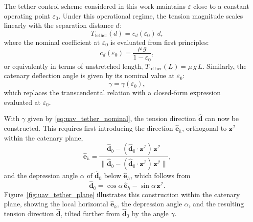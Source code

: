 The tether control scheme considered in this work maintains $\varepsilon$ close to a constant operating point $\varepsilon_0$. Under this operational regime, the tension magnitude scales linearly with the separation distance $d$:
\begin{equation}
    T_{\mathrm{tether}}(d) = c_d(\varepsilon_0)\,d,
    \label{eq:uav_tether_magnitude}
\end{equation}
where the nominal coefficient at $\varepsilon_0$ is evaluated from first principles:
\begin{equation}
    c_d(\varepsilon_0) = \frac{\mu\,g}{1 - \varepsilon_0},
    \label{eq:uav_tether_cd_nominal}
\end{equation}
or equivalently in terms of unstretched length, $T_{\mathrm{tether}}(L) = \mu\,g\,L$. Similarly, the catenary deflection angle is given by its nominal value at $\varepsilon_0$:
\begin{equation}
    \gamma = \gamma(\varepsilon_0),
    \label{eq:uav_tether_nominal}
\end{equation}
which replaces the transcendental relation with a closed-form expression evaluated at $\varepsilon_0$.

With $\gamma$ given by \eqref{eq:uav_tether_nominal}, the tension direction $\hat{\mathbf{d}}$ can now be constructed. This requires first introducing the direction $\hat{\mathbf{e}}_h$, orthogonal to $\mathbf{z}^{\mathcal{I}}$ within the catenary plane,
\begin{equation}
    \hat{\mathbf{e}}_h = \frac{\hat{\mathbf{d}}_0 - (\hat{\mathbf{d}}_0\cdot\mathbf{z}^{\mathcal{I}})\,\mathbf{z}^{\mathcal{I}}}{\|\hat{\mathbf{d}}_0 - (\hat{\mathbf{d}}_0\cdot\mathbf{z}^{\mathcal{I}})\,\mathbf{z}^{\mathcal{I}}\|},
    \label{eq:uav_tether_horizontal}
\end{equation}
and the depression angle $\alpha$ of $\hat{\mathbf{d}}_0$ below $\hat{\mathbf{e}}_h$, which follows from
\begin{equation}
    \hat{\mathbf{d}}_0 = \cos\alpha\,\hat{\mathbf{e}}_h - \sin\alpha\,\mathbf{z}^{\mathcal{I}}.
    \label{eq:uav_tether_alpha}
\end{equation}
Figure~\ref{fig:uav_tether_plane} illustrates this construction within the catenary plane, showing the local horizontal $\hat{\mathbf{e}}_h$, the depression angle $\alpha$, and the resulting tension direction $\hat{\mathbf{d}}$, tilted further from $\hat{\mathbf{d}}_0$ by the angle $\gamma$.



